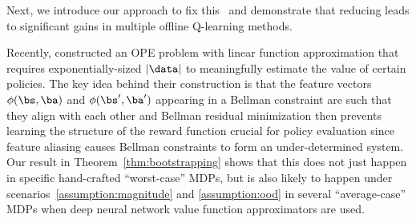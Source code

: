 Next, we introduce our approach to fix this \aliasingproblemname\ and demonstrate that reducing \aliasingproblemname leads to significant gains in multiple offline Q-learning methods. %

\begin{remark}
Recently, \citet{zanette2020exponential} constructed an OPE problem with linear function approximation that requires exponentially-sized $|\data|$ to meaningfully estimate the value of certain policies. The key idea behind their construction is that the feature vectors $\phi(\bs, \ba)$ and $\phi(\bs', \ba')$ appearing in a Bellman constraint are such that they align with each other and Bellman residual minimization then prevents learning the structure of the reward function crucial for policy evaluation since feature aliasing causes Bellman constraints to form an under-determined system. Our result in Theorem~\ref{thm:bootstrapping} shows that this does not just happen in specific hand-crafted ``worst-case'' MDPs, but is also likely to happen under scenarios~\ref{assumption:magnitude} and \ref{assumption:ood} in several ``average-case'' MDPs when deep neural network value function approximators are used.
\end{remark}



